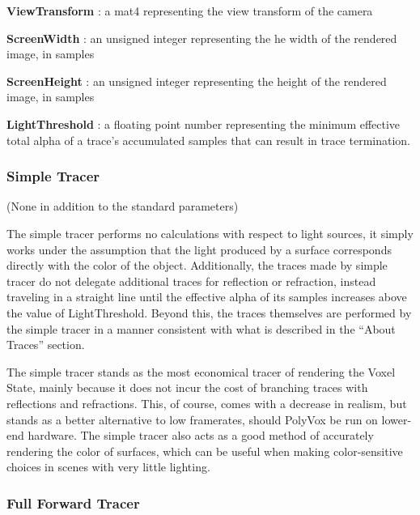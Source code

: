 \documentclass[onecolumn, draftclsnofoot,10pt, compsoc]{IEEEtran}
\newcounter{threesection}[subsubsection]
\begin{document}
\noindent \textbf{ViewTransform} : a mat4 representing the view transform of the camera

\noindent \textbf{ScreenWidth} : an unsigned integer representing the he width of the rendered image, in samples

\noindent \textbf{ScreenHeight} : an unsigned integer representing the height of the rendered image, in samples

\noindent \textbf{LightThreshold} : a floating point number representing the minimum effective total alpha of a trace’s accumulated samples that can result in trace termination.

\subsubsection{Simple Tracer}


(None in addition to the standard parameters)


The simple tracer performs no calculations with respect to light sources, it simply works under the assumption that the light produced by a surface corresponds directly with the color of the object. Additionally, the traces made by simple tracer do not delegate additional traces for reflection or refraction, instead traveling in a straight line until the effective alpha of its samples increases above the value of LightThreshold. Beyond this, the traces themselves are performed by the simple tracer in a manner consistent with what is described in the “About Traces” section.


The simple tracer stands as the most economical tracer of rendering the Voxel State, mainly because it does not incur the cost of branching traces with reflections and refractions. This, of course, comes with a decrease in realism, but stands as a better alternative to low framerates, should PolyVox be run on lower-end hardware. The simple tracer also acts as a good method of accurately rendering the color of surfaces, which can be useful when making color-sensitive choices in scenes with very little lighting. 


\subsubsection{Full Forward Tracer}

\end{document}
